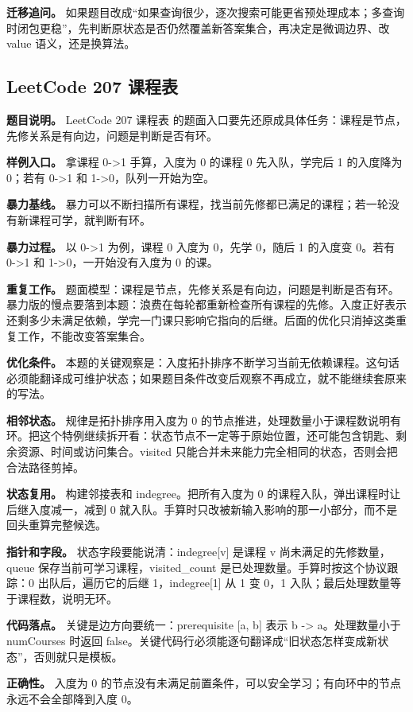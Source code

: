 \textbf{迁移追问。} 如果题目改成“如果查询很少，逐次搜索可能更省预处理成本；多查询时闭包更稳”，先判断原状态是否仍然覆盖新答案集合，再决定是微调边界、改 value 语义，还是换算法。

\subsection{LeetCode 207 课程表}

\textbf{题目说明。} LeetCode 207 课程表 的题面入口要先还原成具体任务：课程是节点，先修关系是有向边，问题是判断是否有环。

\textbf{样例入口。} 拿课程 0->1 手算，入度为 0 的课程 0 先入队，学完后 1 的入度降为 0；若有 0->1 和 1->0，队列一开始为空。

\textbf{暴力基线。} 暴力可以不断扫描所有课程，找当前先修都已满足的课程；若一轮没有新课程可学，就判断有环。

\textbf{暴力过程。} 以 0->1 为例，课程 0 入度为 0，先学 0，随后 1 的入度变 0。若有 0->1 和 1->0，一开始没有入度为 0 的课。

\textbf{重复工作。} 题面模型：课程是节点，先修关系是有向边，问题是判断是否有环。暴力版的慢点要落到本题：浪费在每轮都重新检查所有课程的先修。入度正好表示还剩多少未满足依赖，学完一门课只影响它指向的后继。后面的优化只消掉这类重复工作，不能改变答案集合。

\textbf{优化条件。} 本题的关键观察是：入度拓扑排序不断学习当前无依赖课程。这句话必须能翻译成可维护状态；如果题目条件改变后观察不再成立，就不能继续套原来的写法。

\textbf{相邻状态。} 规律是拓扑排序用入度为 0 的节点推进，处理数量小于课程数说明有环。把这个特例继续拆开看：状态节点不一定等于原始位置，还可能包含钥匙、剩余资源、时间或访问集合。visited 只能合并未来能力完全相同的状态，否则会把合法路径剪掉。

\textbf{状态复用。} 构建邻接表和 indegree。把所有入度为 0 的课程入队，弹出课程时让后继入度减一，减到 0 就入队。手算时只改被新输入影响的那一小部分，而不是回头重算完整候选。

\textbf{指针和字段。} 状态字段要能说清：indegree[v] 是课程 v 尚未满足的先修数量，queue 保存当前可学习课程，visited\_count 是已处理数量。手算时按这个协议跟踪：0 出队后，遍历它的后继 1，indegree[1] 从 1 变 0，1 入队；最后处理数量等于课程数，说明无环。

\textbf{代码落点。} 关键是边方向要统一：prerequisite [a, b] 表示 b -> a。处理数量小于 numCourses 时返回 false。关键代码行必须能逐句翻译成“旧状态怎样变成新状态”，否则就只是模板。

\textbf{正确性。} 入度为 0 的节点没有未满足前置条件，可以安全学习；有向环中的节点永远不会全部降到入度 0。

